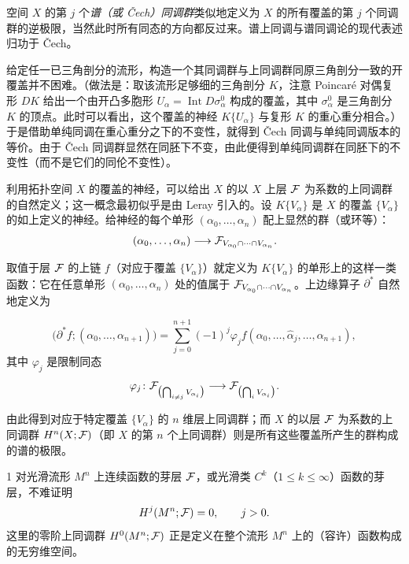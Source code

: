 空间 $X$ 的第 $j$ 个\emph{谱（或 Čech）同调群}类似地定义为 $X$ 的所有覆盖的第 $j$ 个同调群的逆极限，当然此时所有同态的方向都反过来。谱上同调与谱同调论的现代表述归功于 Čech。

给定任一已三角剖分的流形，构造一个其同调群与上同调群同原三角剖分一致的开覆盖并不困难。（做法是：取该流形足够细的三角剖分 $K$，注意 Poincaré 对偶复形 $DK$ 给出一个由开凸多胞形 $U_\alpha=\operatorname{Int}D\sigma^0_\alpha$ 构成的覆盖，其中 $\sigma^0_\alpha$ 是三角剖分 $K$ 的顶点。此时可以看出，这个覆盖的神经 $K\{U_\alpha\}$ 与复形 $K$ 的重心重分相合。）于是借助单纯同调在重心重分之下的不变性，就得到 Čech 同调与单纯同调版本的等价。由于 Čech 同调群显然在同胚下不变，由此便得到单纯同调群在同胚下的不变性（而不是它们的同伦不变性）。

利用拓扑空间 $X$ 的覆盖的神经，可以给出 $X$ 的以 $X$ 上层 $\mathcal{F}$ 为系数的上同调群的自然定义；这一概念最初似乎是由 Leray 引入的。设 $K\{V_\alpha\}$ 是 $X$ 的覆盖 $\{V_\alpha\}$ 的如上定义的神经。给神经的每个单形 $(\alpha_0,\dots,\alpha_n)$ 配上显然的群（或环等）：
\[
  (\alpha_0,\dots,\alpha_n)\longrightarrow\mathcal{F}_{V_{\alpha_0}\cap\cdots\cap V_{\alpha_n}} .
\]

取值于层 $\mathcal{F}$ 的上链 $f$（对应于覆盖 $\{V_\alpha\}$）就定义为 $K\{V_\alpha\}$ 的单形上的这样一类函数：它在任意单形 $(\alpha_0,\dots,\alpha_n)$ 处的值属于 $\mathcal{F}_{V_{\alpha_0}\cap\cdots\cap V_{\alpha_n}}$。上边缘算子 $\partial^*$ 自然地定义为


\[
  \bigl(\partial^*f;(\alpha_0,\dots,\alpha_{n+1})\bigr)=\sum_{j=0}^{n+1}(-1)^j\varphi_j f(\alpha_0,\dots,\widehat{\alpha}_j,\dots,\alpha_{n+1}),
\]
其中 $\varphi_j$ 是限制同态
\[
  \varphi_j\colon\mathcal{F}_{\bigl(\bigcap_{i\neq j}V_{\alpha_i}\bigr)}\longrightarrow\mathcal{F}_{\bigl(\bigcap_i V_{\alpha_i}\bigr)} .
\]

由此得到对应于特定覆盖 $\{V_\alpha\}$ 的 $n$ 维层上同调群；而 $X$ 的以层 $\mathcal{F}$ 为系数的上同调群 $H^n(X;\mathcal{F})$（即 $X$ 的第 $n$ 个上同调群）则是所有这些覆盖所产生的群构成的谱的极限。


\begin{example}{1}
对光滑流形 $M^n$ 上连续函数的芽层 $\mathcal{F}$，或光滑类 $C^k$（$1\le k\le\infty$）函数的芽层，不难证明
\[
  H^j(M^n;\mathcal{F})=0,\qquad j>0 .
\]
这里的零阶上同调群 $H^0(M^n;\mathcal{F})$ 正是定义在整个流形 $M^n$ 上的（容许）函数构成的无穷维空间。
\end{example}

